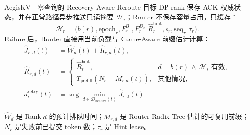 \begin{frame}{AegisKV | 零查询的 Recovery-Aware Reroute}
  \small
  目标 DP rank 保存 ACK 权威状态，并在正常路径异步推送只读摘要
  $\mathcal H_r$；Router 不保存容量占用，只缓存：
  \begin{equation}
    \mathcal H_r=
    \bigl(b(r),\mathrm{epoch}_r,F_r^{B_1},F_r^{B_2},
      \widehat R_r^{\mathrm{hint}},s_r,\mathrm{seq}_r,\tau_r\bigr).
    \label{eq:recovery-hint}
  \end{equation}
  Failure 后，Router 直接用当前负载与 Cache-Aware 前缀估计计算：
  \begin{equation}
    \begin{aligned}
      \widehat J_{r,d}(t)
        &=\widehat W_d(t)+\widehat R_{r,d}(t),\\
      \widehat R_{r,d}(t)
        &=\begin{cases}
          \widehat R_r^{\mathrm{hint}},
            &d=b(r)\ \land\ \mathcal H_r\text{ 有效},\\
          T_{\mathrm{prefill}}\!\left(N_r-M_{r,d}(t)\right),
            &\text{其他情况},
        \end{cases}\\
      d_r^{\mathrm{retry}}(t)
        &=\arg\min_{d\in\mathcal D_{\mathrm{healthy}}(t)}
          \widehat J_{r,d}(t).
    \end{aligned}
    \label{eq:recovery-aware-reroute}
  \end{equation}

  \scriptsize
  $\widehat W_d$ 是 Rank $d$ 的预计排队时间；$M_{r,d}$ 是 Router Radix Tree
  估计的可复用前缀；$N_r$ 是失败前已提交 token 数；$\tau_r$ 是 Hint lease。

  \vspace{0.05cm}
\end{frame}


